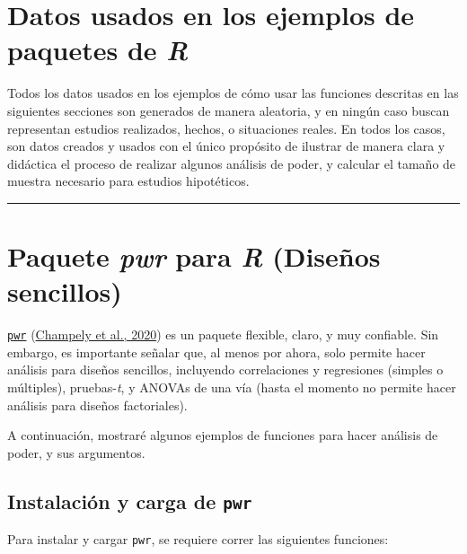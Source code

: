 \documentclass[
]{article}
\begin{document}
\hypertarget{datos-usados-en-los-ejemplos-de-paquetes-de-r}{%
\section{\texorpdfstring{Datos usados en los ejemplos de paquetes de
\emph{R}}{Datos usados en los ejemplos de paquetes de R}}\label{datos-usados-en-los-ejemplos-de-paquetes-de-r}}

Todos los datos usados en los ejemplos de cómo usar las funciones
descritas en las siguientes secciones son generados de manera aleatoria,
y en ningún caso buscan representan estudios realizados, hechos, o
situaciones reales. En todos los casos, son datos creados y usados con
el único propósito de ilustrar de manera clara y didáctica el proceso de
realizar algunos análisis de poder, y calcular el tamaño de muestra
necesario para estudios hipotéticos.

\begin{center}\rule{0.5\linewidth}{0.5pt}\end{center}

\hypertarget{paquete-pwr-para-r-diseuxf1os-sencillos}{%
\section{\texorpdfstring{Paquete \emph{pwr} para \emph{R} (Diseños
sencillos)}{Paquete pwr para R (Diseños sencillos)}}\label{paquete-pwr-para-r-diseuxf1os-sencillos}}

\href{https://www.rdocumentation.org/packages/pwr/versions/1.3-0}{\texttt{pwr}}
(\protect\hyperlink{ref-champelyPwrBasicFunctions2020}{Champely et al.,
2020}) es un paquete flexible, claro, y muy confiable. Sin embargo, es
importante señalar que, al menos por ahora, solo permite hacer análisis
para diseños sencillos, incluyendo correlaciones y regresiones (simples
o múltiples), pruebas-\emph{t}, y ANOVAs de una vía (hasta el momento no
permite hacer análisis para diseños factoriales).

A continuación, mostraré algunos ejemplos de funciones para hacer
análisis de poder, y sus argumentos.

\hypertarget{instalaciuxf3n-y-carga-de-pwr}{%
\subsection{\texorpdfstring{Instalación y carga de
\texttt{pwr}}{Instalación y carga de pwr}}\label{instalaciuxf3n-y-carga-de-pwr}}

Para instalar y cargar \texttt{pwr}, se requiere correr las siguientes
funciones:
\end{document}
